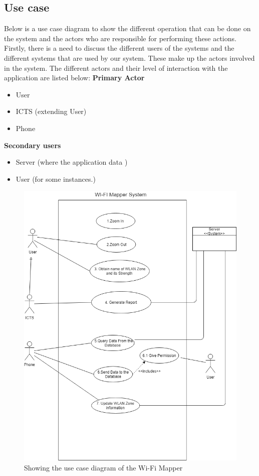 \subsection*{Use case}
Below is a use case diagram to show the different operation that can be done on the system and the actors who are responsible for performing these actions. Firstly, there is a need to discuss the different users of the systems and the different systems that are used by our system. These make up the actors involved in the system. The different actors and their level of interaction with the application are listed below:
\newline\textbf{Primary Actor}
\begin{itemize}
	\item User
	\item ICTS (extending User)
	\item Phone
\end{itemize}
\textbf{Secondary users}
\begin{itemize}
	\item Server (where the application data )
	\item User (for some instances.)
\end{itemize}
\pagebreak
\begin{figure}
	\centering
	\includegraphics[width=0.7
	\linewidth]{"images/Use Case"}
	\caption{Showing the use case diagram of the Wi-Fi Mapper}
	\label{fig:use-case}
\end{figure}

